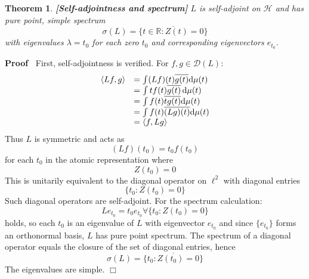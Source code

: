\documentclass{article}
\newcommand{\mathd}{\mathrm{d}}
\newcommand{\tmstrong}[1]{\textbf{#1}}
\newenvironment{proof}{\noindent\textbf{Proof\ }}{\hspace*{\fill}$\Box$\medskip}
\newtheorem{theorem}{Theorem}
\begin{document}
\begin{theorem}
  {\tmstrong{[Self-adjointness and spectrum]\label{thm:spectrum}}} $L$ is
  self-adjoint on $\mathcal{H}$ and has pure point, simple spectrum
  \begin{equation}
    \sigma (L) = \overline{\{t \in \mathbb{R}: Z (t) = 0\}}
  \end{equation}
  with eigenvalues $\lambda = t_0$ for each zero $t_0$ and corresponding
  eigenvectors $e_{t_0}$.
\end{theorem}

\begin{proof}
  First, self-adjointness is verified. For $f, g \in \mathcal{D} (L)$:
  \begin{equation}
    \begin{array}{ll}
      \langle Lf, g \rangle & = \int (Lf) (t) \overline{g (t)} \mathd \mu
      (t)\\
      & = \int tf (t) \overline{g (t)} \hspace{0.17em} \mathd \mu (t)\\
      & = \int f (t) \overline{tg (t)} \mathd \mu (t)\\
      & = \int f (t) \overline{(Lg) (t)} \mathd \mu (t)\\
      & = \langle f, Lg \rangle
    \end{array}
  \end{equation}
  Thus $L$ is symmetric and acts as
  \begin{equation}
    (Lf) (t_0) = t_0 f (t_0)
  \end{equation}
  for each $t_0$ in the atomic representation where
  \begin{equation}
    Z (t_0) = 0
  \end{equation}
  This is unitarily equivalent to the diagonal operator on $\ell^2$ with
  diagonal entries
  \begin{equation}
    \{t_0 : Z (t_0) = 0\}
  \end{equation}
  Such diagonal operators are self-adjoint. For the spectrum calculation:
  \begin{equation}
    Le_{t_0} = t_0 e_{t_0} \forall \{t_0 : Z (t_0) = 0\}
  \end{equation}
  holds, so each $t_0$ is an eigenvalue of $L$ with eigenvector $e_{t_0}$ and
  since $\{e_{t_0} \}$ forms an orthonormal basis, $L$ has pure point
  spectrum. The spectrum of a diagonal operator equals the closure of the set
  of diagonal entries, hence
  \begin{equation}
    \sigma (L) = \overline{\{t_0 : Z (t_0) = 0\}}
  \end{equation}
  The eigenvalues are simple.
\end{proof}
\end{document}
